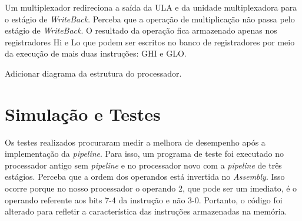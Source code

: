 \documentclass[11pt,a4paper,titlepage]{article}
\begin{document}
Um multiplexador redireciona a saída da ULA e da unidade multiplexadora para o estágio de 
\textit{WriteBack}. Perceba que a operação de multiplicação não passa pelo estágio de 
\textit{WriteBack}. O resultado da operação fica armazenado apenas nos registradores Hi
e Lo que podem ser escritos no banco de registradores por meio da execução de mais duas 
instruções: GHI e GLO.

Adicionar diagrama da estrutura do processador.

\section{Simulação e Testes}

Os testes realizados procuraram medir a melhora de desempenho após a implementação da \textit{pipeline}.
Para isso, um programa de teste foi executado no processador antigo sem \textit{pipeline} e no processador
novo com a \textit{pipeline} de três estágios. Perceba que a ordem dos operandos está invertida no
\textit{Assembly}. Isso ocorre porque no nosso processador o operando 2, que pode ser um imediato, é o
operando referente aos bits 7-4 da instrução e não 3-0. Portanto, o código foi alterado para refletir
a característica das instruções armazenadas na memória.
\end{document}
